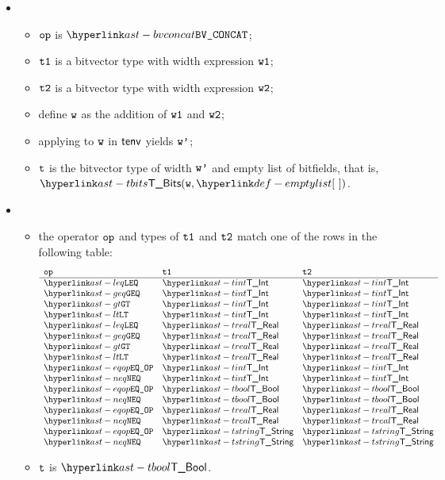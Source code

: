 \begin{itemize}
  \item {}
  \begin{itemize}
    \item $\texttt{op}$ is $\BVCONCAT$;
    \item $\texttt{t1}$ is a bitvector type with width expression $\texttt{w1}$;
    \item $\texttt{t2}$ is a bitvector type with width expression $\texttt{w2}$;
    \item define $\texttt{w}$ as the addition of $\texttt{w1}$ and $\texttt{w2}$;
    \item applying \normalize{} to $\texttt{w}$ in $\textsf{tenv}$ yields $\texttt{w'}$;
    \item $\texttt{t}$ is the bitvector type of width $\texttt{w'}$ and empty list of bitfields, that is, \\ $\TBits(\vw, \emptylist)$.
  \end{itemize}

  \item {}
  \begin{itemize}
    \item the operator $\texttt{op}$ and types of $\texttt{t1}$ and $\texttt{t2}$ match one of the rows in the following table:
    \[
    \begin{array}{lll}
      \mathbf{\op} & \mathbf{\vtone} & \mathbf{\vttwo} \\
      \hline
      \LEQ  & \TInt    & \TInt\\
      \GEQ  & \TInt    & \TInt\\
      \GT   & \TInt    & \TInt\\
      \LT   & \TInt    & \TInt\\
      \LEQ  & \TReal   & \TReal\\
      \GEQ  & \TReal   & \TReal\\
      \GT   & \TReal   & \TReal\\
      \LT   & \TReal   & \TReal\\
      \EQOP & \TInt    & \TInt\\
      \NEQ  & \TInt    & \TInt\\
      \EQOP & \TBool   & \TBool\\
      \NEQ  & \TBool   & \TBool\\
      \EQOP & \TReal   & \TReal\\
      \NEQ  & \TReal   & \TReal\\
      \EQOP & \TString & \TString\\
      \NEQ  & \TString & \TString
    \end{array}
    \]
    \item $\texttt{t}$ is $\TBool$.
  \end{itemize}


\end{itemize}
